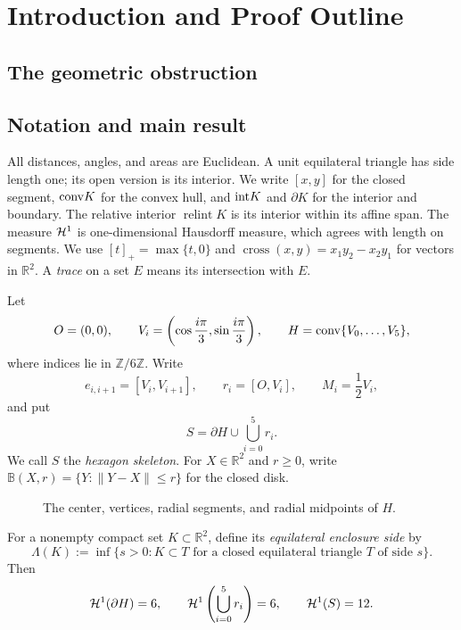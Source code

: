 \section{Introduction and Proof Outline}
\label{sec:introduction}

\subsection{The geometric obstruction}



\subsection{Notation and main result}

All distances, angles, and areas are Euclidean. A unit equilateral triangle
has side length one; its open version is its interior. We write $[x,y]$
for the closed segment, $\mathrm{conv} K$ for the convex hull, and $\mathrm{int} K$
and $\partial K$ for the interior and boundary. The relative interior
$\operatorname{relint}K$ is its interior within its affine span. The measure $\mathcal H^1$ is
one-dimensional Hausdorff measure, which agrees with length on segments.
We use $[t]_+=\max\{t,0\}$ and
$\operatorname{cross}(x,y)=x_1y_2-x_2y_1$ for vectors in $\mathbb R^2$.
A \emph{trace} on a set $E$ means its intersection with $E$.

Let
\[
 O=(0,0),\qquad
 V_i=\left(\cos\frac{i\pi}{3},\sin\frac{i\pi}{3}\right),\qquad
 H=\mathrm{conv}\{V_0,\ldots,V_5\},
\]
where indices lie in $\mathbb Z/6\mathbb Z$.  Write
\[
 e_{i,i+1}=[V_i,V_{i+1}],\qquad r_i=[O,V_i],\qquad M_i=\frac12V_i,
\]
and put
\[
 S=\partial H\cup\bigcup_{i=0}^5r_i.
\]
We call $S$ the \emph{hexagon skeleton}. For $X\in\mathbb R^2$ and $r\ge0$,
write $\mathbb B(X,r)=\{Y:\|Y-X\|\le r\}$ for the closed disk.
\begin{figure}[H]
\centering

\caption{The center, vertices, radial segments, and radial midpoints of $H$.}
\label{fig:geometry-roles}
\end{figure}

For a nonempty compact set $K\subset\mathbb R^2$, define its
\emph{equilateral enclosure side} by
\begin{equation}
 \Lambda(K):=\inf\{s>0:K\subset T\text{ for a closed equilateral
 triangle }T\text{ of side }s\}.
 \label{eq:enclosure-definition}
\end{equation}
Then
\begin{equation}
 \mathcal H^1(\partial H)=6,\qquad
 \mathcal H^1\left(\bigcup_{i=0}^5r_i\right)=6,\qquad \mathcal H^1(S)=12.
\label{eq:target-lengths}
\end{equation}

